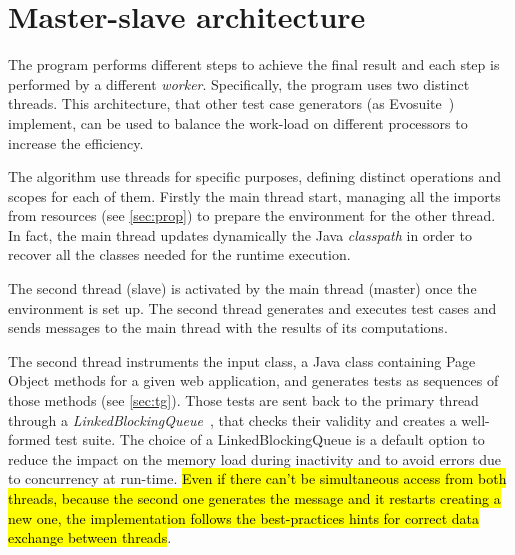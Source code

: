 \section{Master-slave architecture }\label{sec:MSArch}
The program performs different steps to achieve the final result and each step is performed by a different \textit{worker}. Specifically, the program uses two distinct threads. This architecture, that other test case generators (as Evosuite~\cite{evosuite}) implement, can be used to balance the work-load on different processors to increase the efficiency.
 

The algorithm use threads for specific purposes, defining distinct operations and scopes for each of them. Firstly the main thread start, managing all the imports from resources (see \autoref{sec:prop}) to prepare the environment for the other thread. In fact, the main thread updates dynamically the Java \textit{classpath} in order to recover all the classes needed for the runtime execution.

The second thread (slave) is activated by the main thread (master) once the environment is set up. The second thread generates and executes test cases and sends messages to the main thread with the results of its computations.

The second thread instruments the input class, a Java class containing Page Object methods for a given web application, and generates tests as sequences of those methods (see \autoref{sec:tg}). Those tests are sent back to the primary thread through a \textit{LinkedBlockingQueue}~\cite{linkedBlockingQueue}, that checks their validity and creates a well-formed test suite. The choice of a LinkedBlockingQueue is a default option to reduce the impact on the memory load during inactivity and to avoid errors due to concurrency at run-time. \hl{Even if there can't be simultaneous access from both threads, because the second one generates the message and it restarts creating a new one, the implementation follows the best-practices hints for correct data exchange between threads}.